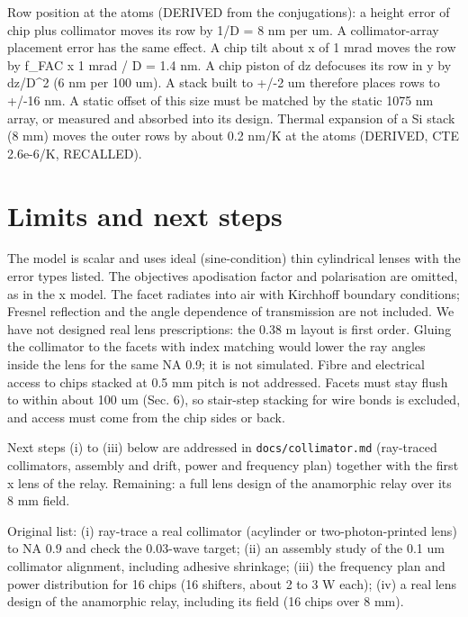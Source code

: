Row position at the atoms (DERIVED from the conjugations): a height
error of chip plus collimator moves its row by 1/D = 8 nm per um. A
collimator-array placement error has the same effect. A chip tilt about
x of 1 mrad moves the row by f\_FAC x 1 mrad / D = 1.4 nm. A chip piston
of dz defocuses its row in y by dz/D\^{}2 (6 nm per 100 um). A stack
built to +/-2 um therefore places rows to +/-16 nm. A static offset of
this size must be matched by the static 1075 nm array, or measured and
absorbed into its design. Thermal expansion of a Si stack (8 mm) moves
the outer rows by about 0.2 nm/K at the atoms (DERIVED, CTE 2.6e-6/K,
RECALLED).

\hypertarget{7-limits-and-next-steps}{%
\section{Limits and next steps}\label{stacked_relay-7-limits-and-next-steps}}

The model is scalar and uses ideal (sine-condition) thin cylindrical
lenses with the error types listed. The objective\textquotesingle s
apodisation factor and polarisation are omitted, as in the x model. The
facet radiates into air with Kirchhoff boundary conditions; Fresnel
reflection and the angle dependence of transmission are not included. We
have not designed real lens prescriptions: the 0.38 m layout is first
order. Gluing the collimator to the facets with index matching would
lower the ray angles inside the lens for the same NA 0.9; it is not
simulated. Fibre and electrical access to chips stacked at 0.5 mm pitch
is not addressed. Facets must stay flush to within about 100 um (Sec.
6), so stair-step stacking for wire bonds is excluded, and access must
come from the chip sides or back.

Next steps (i) to (iii) below are addressed in
\texttt{docs/collimator.md} (ray-traced collimators, assembly and drift,
power and frequency plan) together with the first x lens of the relay.
Remaining: a full lens design of the anamorphic relay over its 8 mm
field.

Original list: (i) ray-trace a real collimator (acylinder or
two-photon-printed lens) to NA 0.9 and check the 0.03-wave target; (ii)
an assembly study of the 0.1 um collimator alignment, including adhesive
shrinkage; (iii) the frequency plan and power distribution for 16 chips
(16 shifters, about 2 to 3 W each); (iv) a real lens design of the
anamorphic relay, including its field (16 chips over 8 mm).

